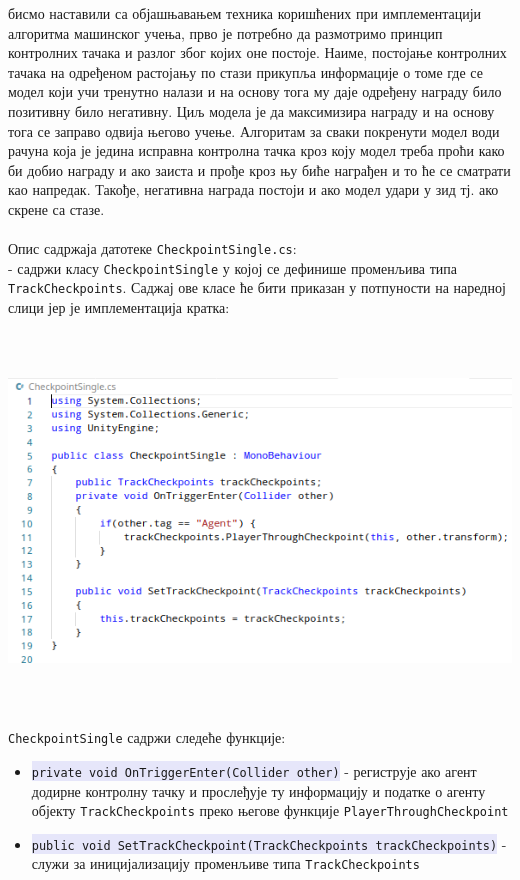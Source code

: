 \documentclass[12pt]{article}
\newcommand{\mycode}[1]{\texttt{\colorbox{Lavender}{#1}}}
\begin{document}
\vspace{0.5cm}
 бисмо наставили са објашњавањем техника коришћених при имплементацији алгоритма машинског учења, прво је потребно да размотримо принцип контролних тачака и разлог због којих оне постоје. Наиме, постојање контролних тачака на одређеном растојању по стази прикупља информације о томе где се модел који учи тренутно налази и на основу тога му даје одређену награду било позитивну било негативну. Циљ модела је да максимизира награду и на основу тога се заправо одвија његово учење. Алгоритам за сваки покренути модел води рачуна која је једина исправна контролна тачка кроз коју модел треба проћи како би добио награду и ако заиста и прође кроз њу биће награђен и то ће се сматрати као напредак. Такође, негативна награда постоји и ако модел удари у зид тј. ако скрене са стазе.\\\\
Опис садржаја датотеке \texttt{CheckpointSingle.cs}:\\
- садржи класу \texttt{CheckpointSingle} у којој се дефинише променљива типа \texttt{TrackCheckpoints}. Саджај ове класе ће бити приказан у потпуности на наредној слици јер је имплементација кратка:
\begin{center}
    \centering 
    \includegraphics[height=10cm, width=15cm]{images/checkPointSingle.png}
\end{center}
\vspace{0.5cm}
 \texttt{CheckpointSingle} садржи следеће функције: 
\begin{itemize}
  \item \mycode{private void OnTriggerEnter(Collider other)} - региструје ако агент додирне контролну тачку и прослеђује ту информацију и податке о агенту објекту \texttt{TrackCheckpoints} преко његове функције \texttt{PlayerThroughCheckpoint}
  \item \mycode{public void SetTrackCheckpoint(TrackCheckpoints trackCheckpoints)} - служи за иницијализацију променљиве типа \texttt{TrackCheckpoints}
\end{itemize}
\end{document}
